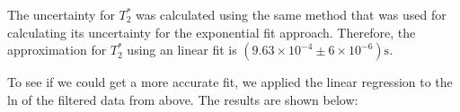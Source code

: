 The uncertainty for $T_{2}^*$ was calculated using the same method that was used for calculating its uncertainty for the exponential fit approach. Therefore, the approximation for $T_{2}^*$ using an linear fit is $(9.63 \times 10^{-4} \pm 6 \times 10^{-6}) \text{s}$. 

To see if we could get a more accurate fit, we applied the linear regression to the ln of the filtered data from above. The results are shown below:








